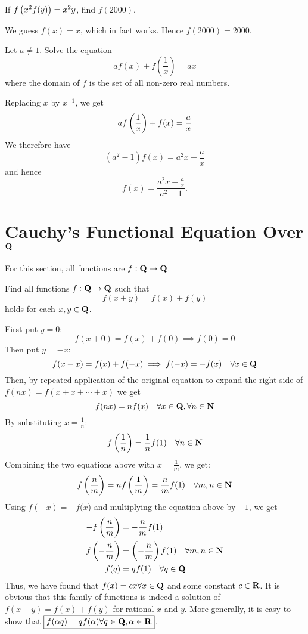 \begin{exercise}
If $f\left(x^2f(y)\right)=x^2y$, find $f(2000)$.
\end{exercise}
\begin{solution}
We guess $f(x)=x$, which in fact works. Hence $f(2000)=\boxed{2000}$.
\end{solution}

\begin{exercise} 
Let $a \neq 1$. Solve the equation 
\[ a f(x)+f\left(\frac{1}{x}\right)=ax \] 
where the domain of $f$ is the set of all non-zero real numbers. 
\end{exercise} 

\begin{solution}
Replacing $x$ by $x^{-1}$, we get \[ a f\left(\frac{1}{x}\right)+f(x)=\frac{a}{x} \] We therefore have \[ (a^2-1)f(x)=a^2 x-\frac{a}{x} \] and hence \[ \boxed{f(x)=\frac{a^2 x-\frac{a}{x}}{a^2-1}}. \]
\end{solution}

\section{Cauchy's Functional Equation Over $\mathbf Q$}
For this section, all functions are $f:\mathbf Q\to\mathbf Q$.
\begin{exercise}
Find all functions $f:\mathbf Q\to\mathbf Q$ such that
\[ f(x+y)=f(x)+f(y) \]
holds for each $x,y \in \mathbf Q$.
\end{exercise}
\begin{solution}
First put $y=0$:
\[ f(x+0)=f(x)+f(0) \implies f(0)=0 \]
Then put $y=-x$:
\[ f(x-x)=f(x)+f(-x) \implies f(-x)=-f(x) \quad \forall x \in \mathbf Q \]
Then, by repeated application of the original equation to expand the right side of $f(nx)=f(x+x+\cdots+x)$ we get
\[ f(nx)=nf(x) \quad \forall x \in \mathbf Q, \forall n \in \mathbf N \]
By substituting $x=\frac{1}{n}$:
\[ f\left(\frac{1}{n}\right)=\frac{1}{n}f(1) \quad \forall n \in \mathbf N \]
Combining the two equations above with $x=\frac{1}{m}$, we get:
\[ f\left(\frac{n}{m}\right)=nf\left(\frac{1}{m}\right)=\frac{n}{m}f(1) \quad \forall m,n \in \mathbf N \]
Using $f(-x)=-f(x$) and multiplying the equation above by $-1$, we get
\begin{align*}
-f\left(\frac{n}{m}\right) &= -\frac{n}{m}f(1) \\
f\left(-\frac{n}{m}\right) &= \left(-\frac{n}{m}\right)f(1) \quad \forall m,n \in \mathbf N \\
f(q) &= qf(1) \quad \forall q \in \mathbf Q
\end{align*}
Thus, we have found that $f(x)=cx \forall x \in \mathbf Q$ and some constant $c \in \mathbf R$. It is obvious that this family of functions is indeed a solution of $f(x+y)=f(x)+f(y)$ for rational $x$ and $y$. More generally, it is easy to show that $\boxed{f(\alpha q)=qf(\alpha) \forall q \in \mathbf Q, \alpha \in \mathbf R}$.
\end{solution}

